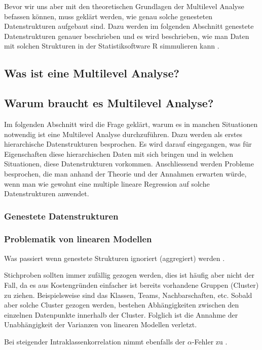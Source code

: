 \documentclass[12pt]{article}\usepackage[]{graphicx}\usepackage[]{color}
\begin{document}

Bevor wir uns aber mit den theoretischen Grundlagen der Multilevel Analyse befassen können, muss geklärt werden, wie genau solche genesteten Datenstrukturen aufgebaut sind. Dazu werden im folgenden Abschnitt genestete Datenstrukturen genauer beschrieben und es wird beschrieben, wie man Daten mit solchen Strukturen in der Statistiksoftware R simmulieren kann \cite{R}.

\subsection{Was ist eine Multilevel Analyse?}


\subsection{Warum braucht es Multilevel Analyse?}
Im folgenden Abschnitt wird die Frage geklärt, warum es in manchen Situationen notwendig ist eine Multilevel Analyse durchzuführen. Dazu werden als erstes hierarchische Datenstrukturen besprochen. Es wird darauf eingegangen, was für Eigenschaften diese hierarchischen Daten mit sich bringen und in welchen Situationen, diese Datenstrukturen vorkommen. Anschliessend werden Probleme besprochen, die man anhand der Theorie und der Annahmen erwarten würde, wenn man wie gewohnt eine multiple lineare Regression auf solche Datenstrukturen anwendet. 

\subsubsection{Genestete Datenstrukturen}
\subsubsection{Problematik von linearen Modellen}

Was passiert wenn genestete Strukturen ignoriert (aggregiert) werden \cite{SnijdersTomA.B2012Ma:a}.

Stichproben sollten immer zufällig gezogen werden, dies ist häufig aber nicht der Fall, da es aus Kostengründen einfacher ist bereits vorhandene Gruppen (Cluster) zu ziehen. Beispielsweise sind das Klassen, Teams, Nachbarschaften, etc. Sobald aber solche Cluster gezogen werden, bestehen Abhängigkeiten zwischen den einzelnen Datenpunkte innerhalb der Cluster. Folglich ist die Annahme der Unabhängigkeit der Varianzen von linearen Modellen verletzt.

Bei steigender Intraklassenkorrelation nimmt ebenfalls der $\alpha$-Fehler zu \cite{dorman2008effect}.
\end{document}
